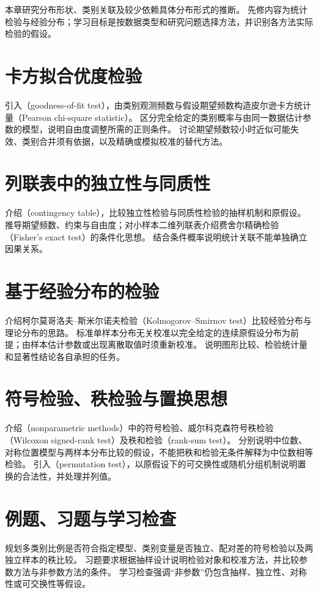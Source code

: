 \documentclass[UTF8,12pt,a4paper,fontset=fandol]{ctexbook}
\begin{document}
本章研究分布形状、类别关联及较少依赖具体分布形式的推断。
先修内容为统计检验与经验分布；学习目标是按数据类型和研究问题选择方法，并识别各方法实际检验的假设。

\section{卡方拟合优度检验}
\label{sec:ps-goodness-fit}
引入（goodness-of-fit test），由类别观测频数与假设期望频数构造皮尔逊卡方统计量（Pearson chi-square statistic）。
区分完全给定的类别概率与由同一数据估计参数的模型，说明自由度调整所需的正则条件。
讨论期望频数较小时近似可能失效、类别合并须有依据，以及精确或模拟校准的替代方法。

\section{列联表中的独立性与同质性}
\label{sec:ps-contingency}
介绍（contingency table），比较独立性检验与同质性检验的抽样机制和原假设。
推导期望频数、约束与自由度；对小样本二维列联表介绍费舍尔精确检验（Fisher's exact test）的条件化思想。
结合条件概率说明统计关联不能单独确立因果关系。

\section{基于经验分布的检验}
\label{sec:ps-empirical-tests}
介绍柯尔莫哥洛夫--斯米尔诺夫检验（Kolmogorov--Smirnov test）比较经验分布与理论分布的思路。
标准单样本分布无关校准以完全给定的连续原假设分布为前提；由样本估计参数或出现离散取值时须重新校准。
说明图形比较、检验统计量和显著性结论各自承担的任务。

\section{符号检验、秩检验与置换思想}
\label{sec:ps-rank-tests}
介绍（nonparametric methods）中的符号检验、威尔科克森符号秩检验（Wilcoxon signed-rank test）及秩和检验（rank-sum test）。
分别说明中位数、对称位置模型与两样本分布比较的假设，不能把秩和检验无条件解释为中位数相等检验。
引入（permutation test），以原假设下的可交换性或随机分组机制说明置换的合法性，并处理并列值。

\section{例题、习题与学习检查}
规划多类别比例是否符合指定模型、类别变量是否独立、配对差的符号检验以及两独立样本的秩比较。
习题要求根据抽样设计说明检验对象和校准方法，并比较参数方法与非参数方法的条件。
学习检查强调“非参数”仍包含抽样、独立性、对称性或可交换性等假设。
\end{document}
